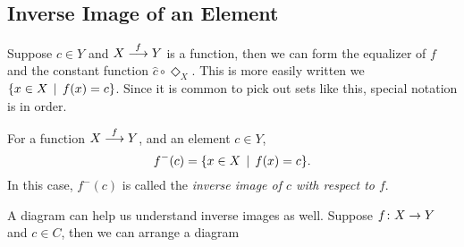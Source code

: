 \subsection*{Inverse Image of an Element}

Suppose $c\in Y$ and $\sfromto fXY$ is a function, then we can form the equalizer of $f$ and the constant function $\hat{c}\circ\Diamond_X$.
This is more easily written we $\{x\in X\st f(x)=c\}$.
Since it is common to pick out sets like this, special notation is in order.

\begin{defn}\label{def:inverse-image}
	For a function $\sfromto fXY$, and an element $c\in Y$, 
	\[f^-(c) = \{x\in X\st f(x)=c\}.\] 
	In this case, $f^-(c)$ is called the \emph{inverse image of $c$ with respect to $f$}.
\end{defn}

A diagram can help us understand inverse images as well. Suppose $\fromto fXY$ and $c\in C$,
then we can arrange a diagram 

